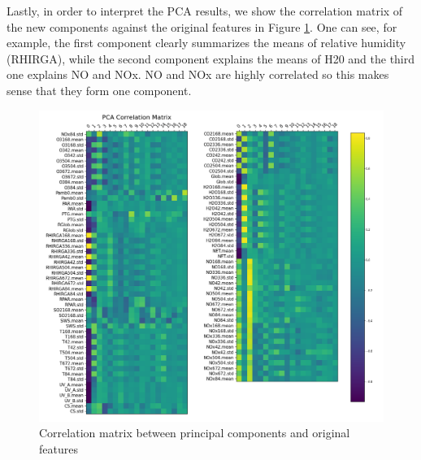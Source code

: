 Lastly, in order to interpret the PCA results, we show the correlation matrix of the new components against the original features in Figure \ref{fig:pca_correlation_matrix}. One can see, for example, the first component clearly summarizes the means of relative humidity (RHIRGA), while the second component explains the means of H20 and the third one explains NO and NOx. NO and NOx are highly correlated so this makes sense that they form one component.

\begin{figure}[!ht]
   \centering
   \includegraphics[width=\textwidth]{images/pca_correlation_matrix.png}
   \caption{Correlation matrix between principal components and original features}
   \label{fig:pca_correlation_matrix}
\end{figure}
